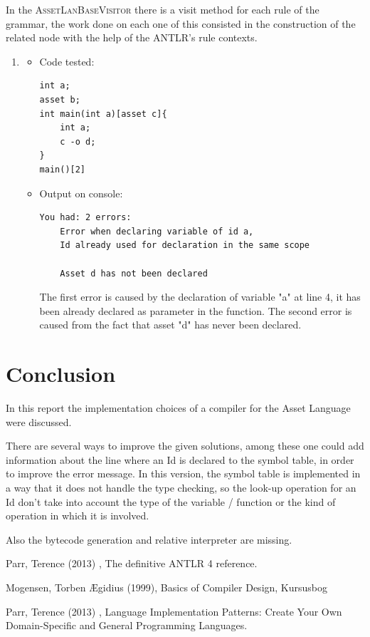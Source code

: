 \documentclass[11pt]{article} %
\begin{document}
\medskip

In the \textsc{AssetLanBaseVisitor} there is a visit method for each rule of the grammar, the work done on each one of this consisted in the construction of the related node with the help of the ANTLR's rule contexts. 

\medskip

\begin{enumerate}
\item
	\begin{itemize}
		\item Code tested: \begin{lstlisting}
int a;
asset b;
int main(int a)[asset c]{
    int a;
    c -o d;
}
main()[2]
		\end{lstlisting}
		\item Output on console: \begin{lstlisting}
You had: 2 errors:
	Error when declaring variable of id a,
	Id already used for declaration in the same scope
	
	Asset d has not been declared
		\end{lstlisting}
		
	The first error is caused by the declaration of variable "a" at line 4, it has been already declared as parameter in the function.
	The second error is caused from the fact that asset "d" has never been declared.
	\end{itemize}
\end{enumerate}

\section{Conclusion}
In this report the implementation choices of a compiler for the Asset Language were discussed. 

\medskip

There are several ways to improve the given solutions, among these one could add information about the line where an Id is declared to the symbol table, in order to improve the error message. In this version, the symbol table is implemented in a way that it does not handle the type checking, so the look-up operation for an Id don't take into account the type of the variable / function or the kind of operation in which it is involved.

\medskip

Also the bytecode generation and relative interpreter are missing.


\begin{thebibliography}{9}
Parr, Terence (2013) , The definitive ANTLR 4 reference.

Mogensen, {Torben {\AE}gidius} (1999), Basics of Compiler Design, Kursusbog 

Parr, Terence (2013) , Language Implementation Patterns: Create Your Own Domain-Specific and General Programming Languages.
\end{thebibliography}
\end{document}
